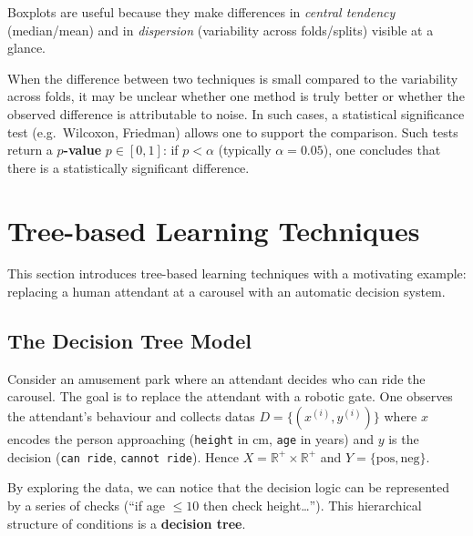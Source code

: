 \begin{tipsblock}
Boxplots are useful because they make differences in \emph{central tendency} (median/mean) and in \emph{dispersion} (variability across folds/splits) visible at a glance.
\end{tipsblock}

\begin{warningblock}
When the difference between two techniques is small compared to the variability across folds, it may be unclear whether one method is truly better or whether the observed difference is attributable to noise.
In such cases, a statistical significance test (e.g.\ Wilcoxon, Friedman) allows one to support the comparison. Such tests return a \textbf{$p$-value} $p \in [0,1]$: if $p < \alpha$ (typically $\alpha = 0.05$), one concludes that there is a statistically significant difference.
\end{warningblock}

\section{Tree-based Learning Techniques}
\label{sec:tree-based}

This section introduces tree-based learning techniques with a motivating example: replacing a human attendant at a carousel with an automatic decision system.

\subsection{The Decision Tree Model}
\label{subsec:decision-tree-model}

Consider an amusement park where an attendant decides who can ride the carousel. The goal is to replace the attendant with a robotic gate. One observes the attendant's behaviour and collects datas $D = \{(x^{(i)}, y^{(i)})\}$ where $x$ encodes the person approaching (\texttt{height} in cm, \texttt{age} in years) and $y$ is the decision (\texttt{can ride}, \texttt{cannot ride}). Hence $X = \mathbb{R}^+ \times \mathbb{R}^+$ and $Y = \{\text{pos}, \text{neg}\}$.

By exploring the data, we can notice that the decision logic can be represented by a series of checks (``if age $\le 10$ then check height\ldots''). This hierarchical structure of conditions is a \textbf{decision tree}.

